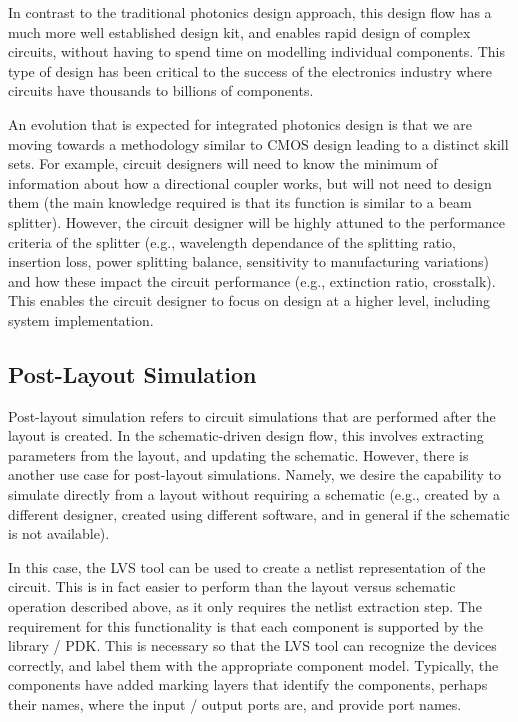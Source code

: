 \documentclass[journal]{spie}
\begin{document}
In contrast to the traditional photonics design approach, this design flow has a much more well established design kit, and enables rapid design of complex circuits, without having to spend time on modelling individual components.  This type of design has been critical to the success of the electronics industry where circuits have thousands to billions of components.

An evolution that is expected for integrated photonics design is that we are moving towards a methodology similar to CMOS design leading to a distinct skill sets.  For example, circuit designers will need to know the minimum of information about how a directional coupler works, but will not need to design them (the main knowledge required is that its function is similar to a beam splitter).  However, the circuit designer will be highly attuned to the performance criteria of the splitter (e.g., wavelength dependance of the splitting ratio, insertion loss, power splitting balance, sensitivity to manufacturing variations) and how these impact the circuit performance (e.g., extinction ratio, crosstalk).  This enables the circuit designer to focus on design at a higher level, including system implementation.


\subsection{Post-Layout Simulation}

Post-layout simulation refers to circuit simulations that are performed after the layout is created.  In the schematic-driven design flow, this involves extracting parameters from the layout, and updating the schematic.  However, there is another use case for post-layout simulations.  Namely, we desire the capability to simulate directly from a layout without requiring a schematic (e.g., created by a different designer,  created using different software, and in general if the schematic is not available).

In this case, the LVS tool can be used to create a netlist representation of the circuit.  This is in fact easier to perform than the layout versus schematic operation described above, as it only requires the netlist extraction step.  The requirement for this functionality is that each component is supported by the library / PDK.  This is necessary so that the LVS tool can recognize the devices correctly, and label them with the appropriate component model.  Typically, the components have added marking layers that identify the components, perhaps their names, where the input / output ports are, and provide port names.
\end{document}
